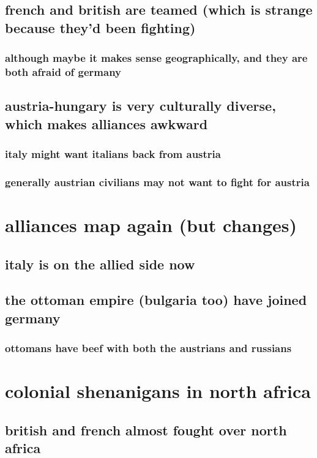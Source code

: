 \documentclass[letterpaper]{article}
\begin{document}
\subsection{french and british are teamed (which is strange because they'd been fighting)}
\label{sec:org3a7a6ed}
\subsubsection{although maybe it makes sense geographically, and they are both afraid of germany}
\label{sec:org37849ba}
\subsection{austria-hungary is very culturally diverse, which makes alliances awkward}
\label{sec:org0d7bf1f}
\subsubsection{italy might want italians back from austria}
\label{sec:orgd9f7ed4}
\subsubsection{generally austrian civilians may not want to fight for austria}
\label{sec:org93830ce}
\section{alliances map again (but changes)}
\label{sec:org70c6651}
\subsection{italy is on the allied side now}
\label{sec:orgdf40a37}
\subsection{the ottoman empire (bulgaria too) have joined germany}
\label{sec:orgb820c43}
\subsubsection{ottomans have beef with both the austrians and russians}
\label{sec:org05dfba4}
\section{colonial shenanigans in north africa}
\label{sec:org4d704e7}
\subsection{british and french almost fought over north africa}
\label{sec:org22e85a9}
\end{document}
